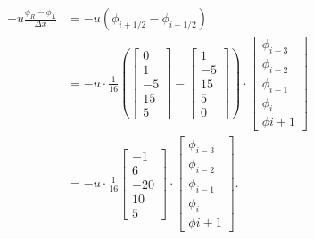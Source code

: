 \documentclass{article}
\begin{document}
\begin{align}
	- u \frac{\phi_R - \phi_L}{\Delta x}
	&=
	- u \left(\phi_{i+1/2} - \phi_{i-1/2} \right) \\
	&=
	- u \cdot \frac{1}{16} \left( 
	\begin{bmatrix}
		0 \\ 1 \\ -5 \\ 15 \\ 5
	\end{bmatrix}
	-
	\begin{bmatrix}
		1 \\ -5 \\ 15 \\ 5 \\ 0
	\end{bmatrix}
	\right)
	\cdot 
	\begin{bmatrix}
		\phi_{i-3} \\
		\phi_{i-2} \\
		\phi_{i-1} \\
		\phi_i \\
		\phi{i+1}
	\end{bmatrix} \\
	&=
	- u \cdot \frac{1}{16}
	\begin{bmatrix}
		-1 \\ 6 \\ -20 \\ 10 \\ 5
	\end{bmatrix}
	\cdot 
	\begin{bmatrix}
		\phi_{i-3} \\
		\phi_{i-2} \\
		\phi_{i-1} \\
		\phi_i \\
		\phi{i+1}
	\end{bmatrix} \text{.}
\end{align}
\end{document}
